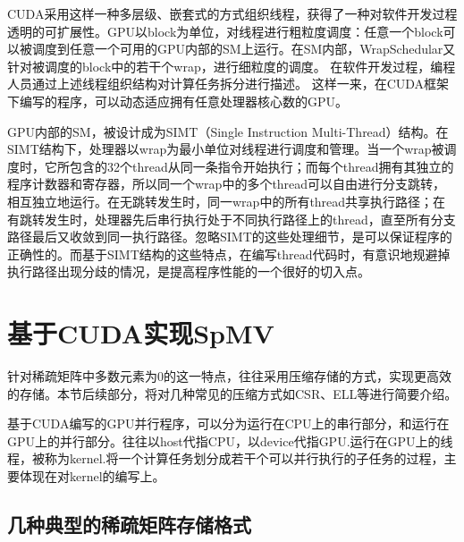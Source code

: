 \documentclass[11pt,twocolumn]{article}
\begin{document}
CUDA采用这样一种多层级、嵌套式的方式组织线程，获得了一种对软件开发过程透明的可扩展性。GPU以block为单位，对线程进行粗粒度调度：任意一个block可以被调度到任意一个可用的GPU内部的SM上运行。在SM内部，WrapSchedular又针对被调度的block中的若干个wrap，进行细粒度的调度。
在软件开发过程，编程人员通过上述线程组织结构对计算任务拆分进行描述。
这样一来，在CUDA框架下编写的程序，可以动态适应拥有任意处理器核心数的GPU。

GPU内部的SM，被设计成为SIMT（Single Instruction Multi-Thread）结构。在SIMT结构下，处理器以wrap为最小单位对线程进行调度和管理。当一个wrap被调度时，它所包含的32个thread从同一条指令开始执行；而每个thread拥有其独立的程序计数器和寄存器，所以同一个wrap中的多个thread可以自由进行分支跳转，相互独立地运行。在无跳转发生时，同一wrap中的所有thread共享执行路径；在有跳转发生时，处理器先后串行执行处于不同执行路径上的thread，直至所有分支路径最后又收敛到同一执行路径。忽略SIMT的这些处理细节，是可以保证程序的正确性的。而基于SIMT结构的这些特点，在编写thread代码时，有意识地规避掉执行路径出现分歧的情况，是提高程序性能的一个很好的切入点。

\section{基于CUDA实现SpMV}
针对稀疏矩阵中多数元素为0的这一特点，往往采用压缩存储的方式，实现更高效的存储。本节后续部分，将对几种常见的压缩方式如CSR、ELL等进行简要介绍。

基于CUDA编写的GPU并行程序，可以分为运行在CPU上的串行部分，和运行在GPU上的并行部分。往往以host代指CPU，以device代指GPU.运行在GPU上的线程，被称为kernel.将一个计算任务划分成若干个可以并行执行的子任务的过程，主要体现在对kernel的编写上。

\subsection{几种典型的稀疏矩阵存储格式}
\end{document}
